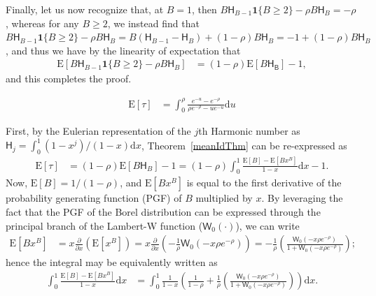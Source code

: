 \documentclass[stsy,dblanonrev]{amers/INFORMS-STSY-Template-26-02-2026/informs4}
\newcommand{\E}[1]{{\mathrm{E}\left[#1\right]}}
\newcommand{\tb}[1]{\textcolor{blue}{#1}}
\begin{document}
Finally, let us now recognize that, at $B = 1$, then
$
B \mathsf{H}_{B-1} \mathbf{1}\{B \geq 2\}
-
\rho B \mathsf{H}_{B}
=
-
\rho
$,
whereas for any $B \geq 2$, we instead find that
$
B \mathsf{H}_{B-1} \mathbf{1}\{B \geq 2\}
-
\rho B \mathsf{H}_{B}
=
B (\mathsf{H}_{B-1} - \mathsf{H}_B)
+
(1-\rho) B \mathsf{H}_{B}
=
-1
+
(1-\rho) B \mathsf{H}_{B}
$,
and thus we have by the linearity of expectation that
\begin{align}
\E{B \mathsf{H}_{B-1} \mathbf{1}\{B \geq 2\}
-
\rho B \mathsf{H}_{B}}
&=
(1-\rho)\E{B \mathsf{H}_\mathsf{B}}
-
1
,
\end{align}
and this completes the proof.
\hfill\Halmos\endproof




\begin{corollary}
\begin{align}
\E{\tau}
&=
\int_0^\rho
\frac{e^{-u} - e^{-\rho}}{\rho e^{-\rho} - u e^{-u}}\mathrm{d}u
\end{align}
\end{corollary}
First, by the Eulerian representation of the $j$th Harmonic number as $\mathsf{H}_j = \int_0^1 (1-x^j)/(1-x) \mathrm{d}x$, Theorem~\ref{meanIdThm} can be re-expressed as
\begin{align}
\E{\tau}
&=
(1-\rho)\E{B \mathsf{H}_B} - 1
=
(1-\rho)\int_0^1\frac{\E{B} - \E{B x^B}}{1-x}\mathrm{d}x
-
1
.
\end{align}
Now, $\E{B} = 1/(1-\rho)$, and $\E{B x^B}$ is equal to the first derivative of the probability generating function (PGF) of $B$ multiplied by $x$. By leveraging the fact that the PGF of the Borel distribution can be expressed through the principal branch of the Lambert-W function ($\mathsf{W}_0(\cdot)$), we can write
\begin{align}
\E{B x^B}
&=
x \frac{\partial}{\partial x}
\left(
\E{x^B}
\right)
=
x \frac{\partial}{\partial x}
\left(
-\frac{1}{\rho}\mathsf{W}_0\left(-x \rho e^{-\rho}\right)
\right)
=
-
\frac{1}{\rho}
\left(
\frac{\mathsf{W}_0\left(-x \rho e^{-\rho}\right)}
{1 + \mathsf{W}_0\left(-x \rho e^{-\rho}\right)}
\right)
;
\end{align}
hence the integral may be equivalently written as
\begin{align}
\int_0^1\frac{\E{B} - \E{B x^B}}{1-x}\mathrm{d}x
&=
\int_0^1\frac{1}{1-x}\left(\frac{1}{1-\rho} +  \frac{1}{\rho}
\left(
\frac{\mathsf{W}_0\left(-x \rho e^{-\rho}\right)}
{1 + \mathsf{W}_0\left(-x \rho e^{-\rho}\right)}
\right)\right)\mathrm{d}x
.
\end{align}
\end{document}
